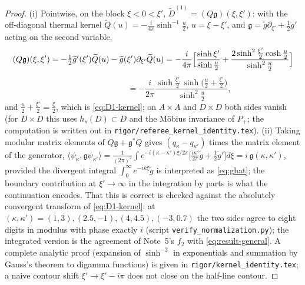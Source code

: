 \documentclass[11pt]{article}
\theoremstyle{accent}
\theoremstyle{definition}
\newcommand{\gt}{\widetilde g}
\begin{document}
\begin{proof}
(i) Pointwise, on the block \(\xi<0<\xi'\), \(\widetilde D^{(1)}=(Q\mathfrak g)(\xi,\xi')\): with the off-diagonal thermal kernel \(\widetilde Q(u)=-\frac{i}{4\pi}\sinh^{-1}\frac u2\), \(u=\xi-\xi'\), and \(\mathfrak g=\gt\partial_{\xi'}+\frac12\gt'\) acting on the second variable,
\[
 (Q\mathfrak g)(\xi,\xi')=-\tfrac12\gt'(\xi')\widetilde Q(u)-\gt(\xi')\partial_{\xi'}\widetilde Q(u)
 =-\frac{i}{4\pi}\Bigl[\frac{\sinh\xi'}{\sinh\frac u2}+\frac{2\sinh^2\frac{\xi'}2\cosh\frac u2}{\sinh^2\frac u2}\Bigr]
\]
\[
 \phantom{(Q\mathfrak g)(\xi,\xi')}=-\frac{i}{2\pi}\frac{\sinh\frac{\xi'}2\,\sinh\bigl(\frac u2+\frac{\xi'}2\bigr)}{\sinh^2\frac u2},
\]
and \(\frac u2+\frac{\xi'}2=\frac\xi2\), which is \eqref{eq:D1-kernel}; on \(A\times A\) and \(D\times D\) both sides vanish (for \(D\times D\) this uses \(h_s(D)\subset D\) and the M\"obius invariance of \(P_+\); the computation is written out in \texttt{rigor/referee\_kernel\_identity.tex}).  (ii) Taking modular matrix elements of \(Q\mathfrak g+\mathfrak g^*Q\) gives \((q_\kappa-q_{\kappa'})\) times the matrix element of the generator, \(\langle\psi_\kappa,\mathfrak g\psi_{\kappa'}\rangle=\frac1{(2\pi)^2}\int e^{-i(\kappa-\kappa')\xi/2\pi}\bigl[\frac{i\kappa'}{2\pi}\gt+\frac12\gt'\bigr]d\xi=i\,\mathfrak g(\kappa,\kappa')\), provided the divergent integral \(\int_0^\infty e^{-ik\xi}\gt\) is interpreted as \eqref{eq:ghat}; the boundary contribution at \(\xi'\to\infty\) in the integration by parts is what the continuation encodes.  That this is correct is checked against the absolutely convergent transform of \eqref{eq:D1-kernel}: at \((\kappa,\kappa')=(1,3),(2.5,-1),(4,4.5),(-3,0.7)\) the two sides agree to eight digits in modulus with phase exactly \(i\) (script \texttt{verify\_normalization.py}); the integrated version is the agreement of Note~5's \(f_2\) with \eqref{eq:result-general}.  A complete analytic proof (expansion of \(\sinh^{-2}\) in exponentials and summation by Gauss's theorem to digamma functions) is given in \texttt{rigor/kernel\_identity.tex}; a naive contour shift \(\xi'\to\xi'-i\pi\) does not close on the half-line contour.
\end{proof}
\end{document}
